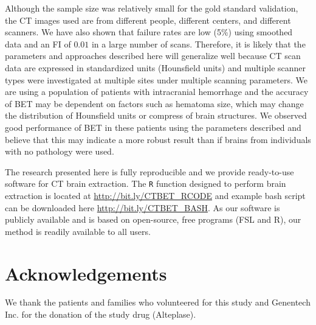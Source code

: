 \documentclass{elsarticle}\usepackage[]{graphicx}\usepackage[]{color}
\begin{document}
Although the sample size was relatively small for the gold standard validation, the CT images used are from different people, different centers, and different scanners.  We have also shown that failure rates are low (5\%) using smoothed data and an FI of $0.01$ in a large number of scans.
Therefore, it is likely that the parameters and approaches described here will generalize well because CT scan data are expressed in standardized units (Hounsfield units) and multiple scanner types were investigated at multiple sites under multiple scanning parameters.  We are using a population of patients with intracranial hemorrhage and the accuracy of BET may be dependent on factors such as hematoma size, which may change the distribution of Hounsfield units or compress of brain structures.  We observed good performance of BET in these patients using the parameters described and believe that this may indicate a more robust result than if brains from individuals with no pathology were used.

The research presented here is fully reproducible and we provide ready-to-use software for CT brain extraction. The \texttt{R} function designed to perform brain extraction is located at
\url{http://bit.ly/CTBET_RCODE} and example bash script can be downloaded here \url{http://bit.ly/CTBET_BASH}.  As our software is publicly available and is based on open-source, free programs (FSL and R), our method is readily available to all users.

\section*{Acknowledgements}
We thank the patients and families who volunteered for this study and Genentech Inc. for the donation of the study drug (Alteplase).
\end{document}
